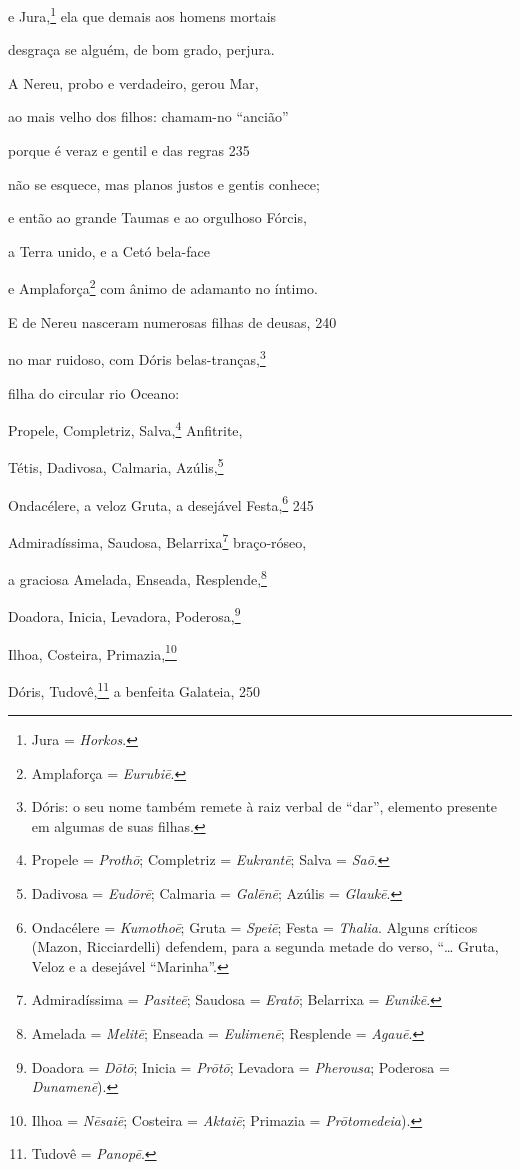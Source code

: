 e Jura,\footnote{Jura = \emph{Horkos}.} ela que demais aos homens mortais

desgraça se alguém, de bom grado, perjura.

\medskip

A Nereu, probo e verdadeiro, gerou Mar,

ao mais velho dos filhos: chamam-no ``ancião''

porque é veraz e gentil e das regras \num{235}

não se esquece, mas planos justos e gentis conhece;

e então ao grande Taumas e ao orgulhoso Fórcis,

a Terra unido, e a Cetó bela-face

e Amplaforça\footnote{Amplaforça = \emph{Eurubiē}.} com ânimo de adamanto no íntimo.

E de Nereu nasceram numerosas filhas de deusas, \num{240}

no mar ruidoso, com Dóris belas-tranças,\footnote{Dóris: o seu nome também remete à raiz verbal de ``dar'', elemento presente em algumas de suas filhas.}

filha do circular rio Oceano:

Propele, Completriz, Salva,\footnote{Propele = \emph{Prothō}; Completriz = \emph{Eukrantē}; Salva = \emph{Saō}.} Anfitrite,

Tétis, Dadivosa, Calmaria, Azúlis,\footnote{Dadivosa = \emph{Eudōrē}; Calmaria = \emph{Galēnē}; Azúlis = \emph{Glaukē}.}

Ondacélere, a veloz Gruta, a desejável Festa,\footnote{Ondacélere = \emph{Kumothoē}; Gruta = \emph{Speiē}; Festa = \emph{Thalia}. Alguns críticos (Mazon, Ricciardelli) defendem, para a segunda metade do verso, ``\ldots{} Gruta, Veloz e a desejável ``Marinha''.} \num{245}

Admiradíssima, Saudosa, Belarrixa\footnote{Admiradíssima = \emph{Pasiteē}; Saudosa = \emph{Eratō}; Belarrixa = \emph{Eunikē}.} braço-róseo,

a graciosa Amelada, Enseada, Resplende,\footnote{Amelada = \emph{Melitē}; Enseada = \emph{Eulimenē}; Resplende = \emph{Agauē}.}

Doadora, Inicia, Levadora, Poderosa,\footnote{Doadora = \emph{Dōtō}; Inicia = \emph{Prōtō}; Levadora = \emph{Pherousa}; Poderosa = \emph{Dunamenē}).}

Ilhoa, Costeira, Primazia,\footnote{Ilhoa = \emph{Nēsaiē}; Costeira = \emph{Aktaiē}; Primazia = \emph{Prōtomedeia}).}

Dóris, Tudovê,\footnote{Tudovê = \emph{Panopē}.} a benfeita Galateia, \num{250}

